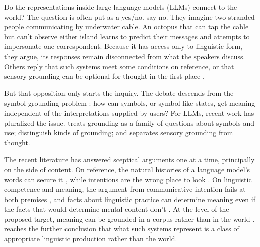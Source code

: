 \documentclass[12pt]{article}
\begin{document}
Do the representations inside large language models (LLMs) connect to the world? The
question is often put as a yes/no. \textcite{bender2020} say no. They imagine two
stranded people communicating by underwater cable. An octopus that can tap the cable
but can't observe either island learns to predict their messages and attempts to impersonate
one correspondent. Because it has access only to linguistic form, they argue, its responses
remain disconnected from what the speakers discuss. Others reply that such systems
meet some conditions on reference, or that sensory grounding can be optional
for thought in the first place
\citep{coelho_mollo_milliere_2026_vector_grounding_problem,chalmers_2023_thought_sensory_grounding_llms}.

But that opposition only starts the inquiry. The debate descends from the symbol-grounding
problem
\citep{harnad_1990_symbol_grounding_problem}: how can symbols, or symbol-like states,
get meaning independent of the interpretations supplied by users? For LLMs, recent work
has pluralized the issue. \textcite{pavlick_2023_symbols_and_grounding_llms}
treats grounding as a family of questions about symbols and use;
\textcite{coelho_mollo_milliere_2026_vector_grounding_problem} distinguish kinds of
grounding; and \textcite{chalmers_2023_thought_sensory_grounding_llms} separates sensory
grounding from thought.

The recent literature has answered sceptical arguments one at a time, principally on the
side of content. On reference, the natural histories of a language model's words can
secure it \citep{mandelkern_linzen_2024_do_language_models_words_refer}, while intentions
are the wrong place to look \citep{pepp_2025_reference_without_intentions_llms}. On
linguistic competence and meaning, the argument from communicative intention fails at
both premises \citep{attah_2025_do_language_models_lack_communicative_intentions}, and
facts about linguistic practice can determine meaning even if the facts that would
determine mental content don't
\citep{grindrod_2024_large_language_models_linguistic_intentionality}. At the level of the
proposed target, meaning can be grounded in a corpus rather than in the world
\citep{havlik_2024_meaning_understanding_llms_synthese}.
\textcite{ruyant_2026_what_do_llms_represent} reaches the further conclusion that what such
systems represent is a class of appropriate linguistic production rather than the world.
\end{document}
